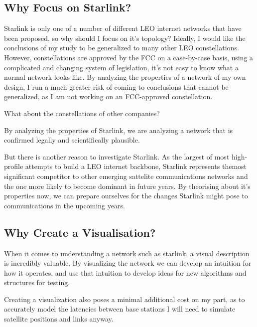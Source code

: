 \documentclass[12pt]{article}
\begin{document}
\subsection{Why Focus on Starlink?}

Starlink is only one of a number of different LEO internet networks that have been proposed, so why should I focus on it's topology? Ideally, I would like the conclusions of my study to be generalized to many other LEO constellations. However, constellations are approved by the FCC on a case-by-case basis, using a complicated and changing system of legislation, it's not easy to know what a normal network looks like. By analyzing the properties of a network of my own design, I run a much greater risk of coming to conclusions that cannot be generalized, as I am not working on an FCC-approved constellation.

What about the constellations of other companies? %

By analyzing the properties of Starlink, we are analyzing a network that is confirmed legally and scientifically plausible.

But there is another reason to investigate Starlink. As the largest of most high-profile attempts to build a LEO internet backbone, Starlink represents themost significant competitor to other emerging sattelite communications networks and the one more likely to become dominant in future years. By theorising about it's properties now, we can prepare ourselves for the changes Starlink might pose to communications in the upcoming years.

\subsection{Why Create a Visualisation?}
When it comes to understanding a network such as starlink, a visual description is incredibly valuable. By visualizing the network we can develop an intuition for how it operates, and use that intuition to develop ideas for new algorithms and structures for testing.

Creating a visualization also poses a minimal additional cost on my part, as to accurately model the latencies between base stations I will need to simulate satellite positions and links anyway.
\end{document}

